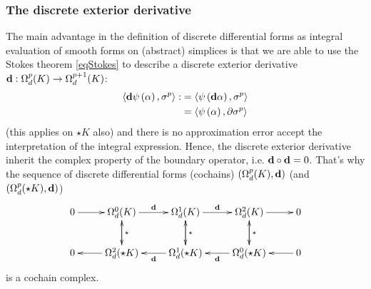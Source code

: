    \subsubsection{The discrete exterior derivative}
      The main advantage in the definition of discrete differential forms as integral evaluation of smooth forms on (abstract) simplices is
      that we are able to use the Stokes theorem \eqref{eqStokes} to describe a discrete exterior derivative
      \( \mathbf{d} : \Omega^{p}_{d}(K) \rightarrow \Omega^{p+1}_{d}(K) \):
      \begin{align}
        \left\langle \mathbf{d}\psi\left( \alpha \right), \sigma^{p} \right\rangle \label{eqDisExD}
                :&= \left\langle \psi\left( \mathbf{d}\alpha \right), \sigma^{p} \right\rangle \\
                &= \left\langle \psi\left( \alpha \right), \partial\sigma^{p} \right\rangle \label{eqStokes}
      \end{align}
      (this applies on \( \star K \) also) and there is no approximation error accept the interpretation of the integral expression.
      Hence, the discrete exterior derivative inherit the complex property of the boundary operator, i.e. \( \mathbf{d}\circ\mathbf{d}=0 \).
      That's why the sequence of discrete differential forms (cochains) \( \left( \Omega^{p}_{d}(K), \mathbf{d} \right)\) 
      (and  \( \left( \Omega^{p}_{d}(\star K), \mathbf{d} \right) \))
      \begin{align}
      \begin{xy}
        \xymatrix{
          0 \ar[r] & 
          \Omega^{0}_{d}(K) \ar[r]^{\exd} \ar[d]^{\star} & 
          \Omega^{1}_{d}(K) \ar[r]^{\exd} \ar[d]^{\star} & 
          \Omega^{2}_{d}(K) \ar[r] \ar[d]^{\star} &
          0 \\
          0  & 
          \Omega^{2}_{d}(\star K) \ar[l] \ar[u]& 
          \Omega^{1}_{d}(\star K) \ar[l]^{\exd} \ar[u] & 
          \Omega^{0}_{d}(\star K) \ar[l]^{\exd} \ar[u] &
          0 \ar[l]
        }
      \end{xy}
      \end{align}
      is a cochain complex.

